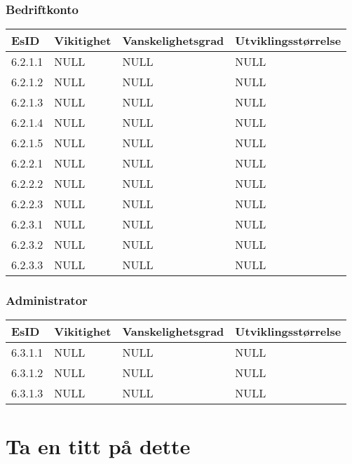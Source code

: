 \documentclass[12pt]{article}
\begin{document}
        \subsubsection{Bedriftkonto}
        \begin{tabular}{|p{2cm}|p{4cm}|p{4cm}|p{4cm}| } 
            \hline
            \bf EsID & \bf Vikitighet & \bf Vanskelighetsgrad & \bf Utviklingsstørrelse\\
            \hline
            6.2.1.1 & NULL & NULL & NULL\\
            \hline
            6.2.1.2 & NULL & NULL & NULL\\
            \hline
            6.2.1.3 & NULL & NULL & NULL\\
            \hline
            6.2.1.4 & NULL & NULL & NULL\\
            \hline
            6.2.1.5 & NULL & NULL & NULL\\
            \hline
            6.2.2.1 & NULL & NULL & NULL\\
            \hline
            6.2.2.2 & NULL & NULL & NULL\\
            \hline
            6.2.2.3 & NULL & NULL & NULL\\
            \hline
            6.2.3.1 & NULL & NULL & NULL\\
            \hline
            6.2.3.2 & NULL & NULL & NULL\\
            \hline
            6.2.3.3 & NULL & NULL & NULL\\
            \hline
        \end{tabular}

        \subsubsection{Administrator}
        \begin{tabular}{|p{2cm}|p{4cm}|p{4cm}|p{4cm}| } 
            \hline
            \bf EsID & \bf Vikitighet & \bf Vanskelighetsgrad & \bf Utviklingsstørrelse\\
            \hline
            6.3.1.1 & NULL & NULL & NULL\\
            \hline
            6.3.1.2 & NULL & NULL & NULL\\
            \hline
            6.3.1.3 & NULL & NULL & NULL\\
            \hline
        \end{tabular}
\section{Ta en titt på dette}
\end{document}
